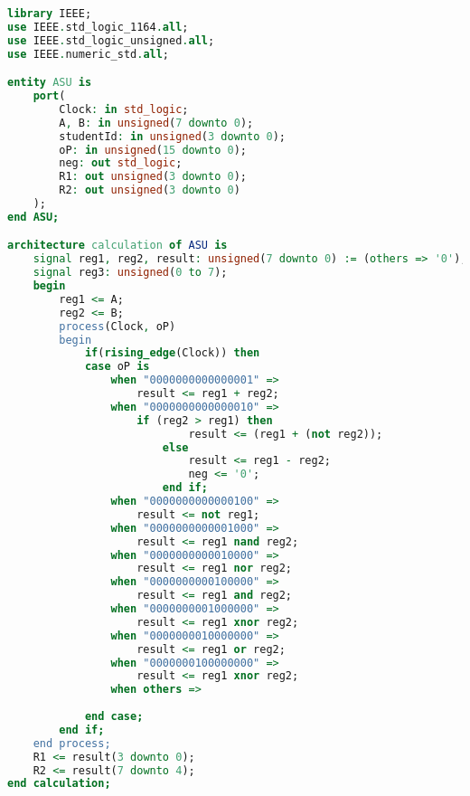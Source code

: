 
\begin{lstlisting}[language=VHDL, caption={VHDL code for the General Purpose ALU}]
library IEEE;
use IEEE.std_logic_1164.all;
use IEEE.std_logic_unsigned.all;
use IEEE.numeric_std.all;

entity ASU is
    port(
        Clock: in std_logic;
        A, B: in unsigned(7 downto 0);
        studentId: in unsigned(3 downto 0);
        oP: in unsigned(15 downto 0);
        neg: out std_logic;
        R1: out unsigned(3 downto 0);
        R2: out unsigned(3 downto 0)
    );
end ASU;

architecture calculation of ASU is
    signal reg1, reg2, result: unsigned(7 downto 0) := (others => '0');
    signal reg3: unsigned(0 to 7);
    begin
        reg1 <= A;
        reg2 <= B;
        process(Clock, oP)
        begin
            if(rising_edge(Clock)) then 
            case oP is
                when "0000000000000001" =>
                    result <= reg1 + reg2;
                when "0000000000000010" =>
                    if (reg2 > reg1) then
                            result <= (reg1 + (not reg2));
                        else
                            result <= reg1 - reg2;
                            neg <= '0';
                        end if;
                when "0000000000000100" =>
                    result <= not reg1;
                when "0000000000001000" =>
                    result <= reg1 nand reg2;
                when "0000000000010000" =>
                    result <= reg1 nor reg2;
                when "0000000000100000" =>
                    result <= reg1 and reg2;
                when "0000000001000000" =>
                    result <= reg1 xnor reg2;
                when "0000000010000000" =>
                    result <= reg1 or reg2;
                when "0000000100000000" =>
                    result <= reg1 xnor reg2;
                when others =>
                
            end case;
        end if;
    end process;
    R1 <= result(3 downto 0);
    R2 <= result(7 downto 4);
end calculation;
\end{lstlisting}
